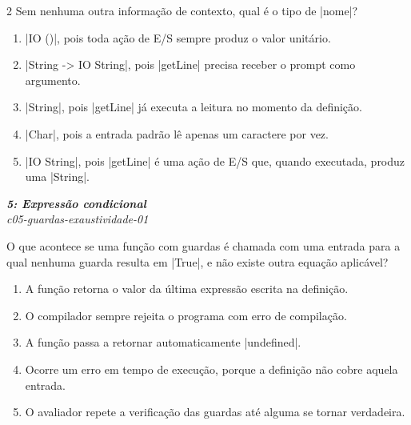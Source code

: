 \documentclass[a4paper,10pt,brazil]{article}
\begin{document}
\begin{multicols}{2}
Sem nenhuma outra informação de contexto, qual é o tipo de \haskellinline|nome|?

\begin{enumerate}
  \item \haskellinline|IO ()|, pois toda ação de E/S sempre produz o valor unitário.

  \item \haskellinline|String -> IO String|, pois \haskellinline|getLine| precisa receber o prompt como argumento.

  \item \haskellinline|String|, pois \haskellinline|getLine| já executa a leitura no momento da definição.

  \item \haskellinline|Char|, pois a entrada padrão lê apenas um caractere por vez.

  \item \haskellinline|IO String|, pois \haskellinline|getLine| é uma ação de E/S que, quando executada, produz uma \haskellinline|String|.


\end{enumerate}

\begin{flushright}
  \footnotesize
  \textit{\textbf{5: Expressão condicional}}\\
  \textit{c05-guardas-exaustividade-01}\\

\end{flushright}
O que acontece se uma função com guardas é chamada com uma entrada para a qual nenhuma guarda resulta em \haskellinline|True|, e não existe outra equação aplicável?

\begin{enumerate}
  \item A função retorna o valor da última expressão escrita na definição.

  \item O compilador sempre rejeita o programa com erro de compilação.

  \item A função passa a retornar automaticamente \haskellinline|undefined|.

  \item Ocorre um erro em tempo de execução, porque a definição não cobre aquela entrada.

  \item O avaliador repete a verificação das guardas até alguma se tornar verdadeira.



\end{enumerate}
\end{multicols}
\end{document}
